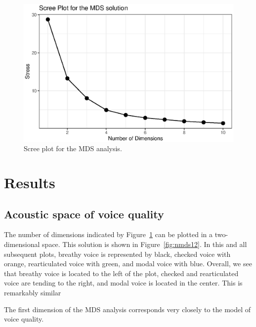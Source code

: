 \begin{figure}[htbp]
    \centering
    \includegraphics{images/stress_plot.eps}
    \caption{Scree plot for the MDS analysis.}
    \label{fig:stress_plot}
\end{figure}
\section{Results} \label{sec:acousticlandscape:results}
\subsection{Acoustic space of voice quality} \label{sec:acousticlandscape:space}
The number of dimensions indicated by Figure~\ref{fig:stress_plot} can be plotted in a two-dimensional space. This solution is shown in Figure~\ref{fig:nmds12}. 
In this and all subsequent plots, breathy voice is represented by black, checked voice with orange, rearticulated voice with green, and modal voice with blue. Overall, we see that breathy voice is located to the left of the plot, checked and rearticulated voice are tending to the right, and modal voice is located in the center. This is remarkably similar 

The first dimension of the MDS analysis corresponds very closely to the \citet{gordonPhonationTypesCrosslinguistic2001} model of voice quality.   

